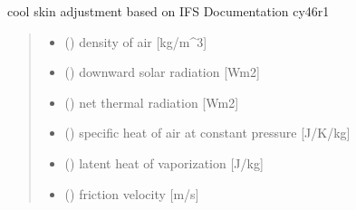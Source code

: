 \documentclass[letterpaper,10pt,english]{sphinxmanual}
\begin{document}
\begin{fulllineitems}
\label{\detokenize{users_guide:cs_wl_subs.cs_ecmwf}}
\pysigstartsignatures
{}
\pysigstopsignatures
\sphinxAtStartPar
cool skin adjustment based on IFS Documentation cy46r1
\begin{quote}\begin{description}
\begin{itemize}
\item {} 
\sphinxAtStartPar
{} () \textendash{} density of air               {[}kg/m\textasciicircum{}3{]}

\item {} 
\sphinxAtStartPar
{} () \textendash{} downward solar radiation {[}Wm\sphinxhyphen{}2{]}

\item {} 
\sphinxAtStartPar
{} () \textendash{} net thermal radiation     {[}Wm\sphinxhyphen{}2{]}

\item {} 
\sphinxAtStartPar
{} () \textendash{} specific heat of air at constant pressure {[}J/K/kg{]}

\item {} 
\sphinxAtStartPar
{} () \textendash{} latent heat of vaporization   {[}J/kg{]}

\item {} 
\sphinxAtStartPar
{} () \textendash{} friction velocity         {[}m/s{]}


\end{itemize}
\end{description}
\end{quote}
\end{fulllineitems}
\end{document}
